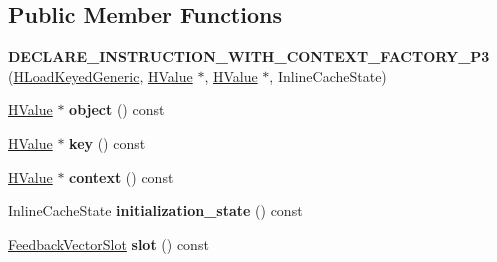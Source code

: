 \subsection*{Public Member Functions}
\begin{DoxyCompactItemize}
\item 
{\bfseries D\+E\+C\+L\+A\+R\+E\+\_\+\+I\+N\+S\+T\+R\+U\+C\+T\+I\+O\+N\+\_\+\+W\+I\+T\+H\+\_\+\+C\+O\+N\+T\+E\+X\+T\+\_\+\+F\+A\+C\+T\+O\+R\+Y\+\_\+\+P3} (\hyperlink{classv8_1_1internal_1_1_h_load_keyed_generic}{H\+Load\+Keyed\+Generic}, \hyperlink{classv8_1_1internal_1_1_h_value}{H\+Value} $\ast$, \hyperlink{classv8_1_1internal_1_1_h_value}{H\+Value} $\ast$, Inline\+Cache\+State)\hypertarget{classv8_1_1internal_1_1_h_load_keyed_generic_ae05a4bfd6dc3c566c8d059e0285dacdb}{}\label{classv8_1_1internal_1_1_h_load_keyed_generic_ae05a4bfd6dc3c566c8d059e0285dacdb}

\item 
\hyperlink{classv8_1_1internal_1_1_h_value}{H\+Value} $\ast$ {\bfseries object} () const \hypertarget{classv8_1_1internal_1_1_h_load_keyed_generic_ad3fba7de4da9b0bc53640b595f5163cc}{}\label{classv8_1_1internal_1_1_h_load_keyed_generic_ad3fba7de4da9b0bc53640b595f5163cc}

\item 
\hyperlink{classv8_1_1internal_1_1_h_value}{H\+Value} $\ast$ {\bfseries key} () const \hypertarget{classv8_1_1internal_1_1_h_load_keyed_generic_a029b57eba4b5bc54a487be283521f0f8}{}\label{classv8_1_1internal_1_1_h_load_keyed_generic_a029b57eba4b5bc54a487be283521f0f8}

\item 
\hyperlink{classv8_1_1internal_1_1_h_value}{H\+Value} $\ast$ {\bfseries context} () const \hypertarget{classv8_1_1internal_1_1_h_load_keyed_generic_a2a8bdb7fea7c726b72aa59ed00c46b2c}{}\label{classv8_1_1internal_1_1_h_load_keyed_generic_a2a8bdb7fea7c726b72aa59ed00c46b2c}

\item 
Inline\+Cache\+State {\bfseries initialization\+\_\+state} () const \hypertarget{classv8_1_1internal_1_1_h_load_keyed_generic_aa873ecbccae6b9f8de247362d53537aa}{}\label{classv8_1_1internal_1_1_h_load_keyed_generic_aa873ecbccae6b9f8de247362d53537aa}

\item 
\hyperlink{classv8_1_1internal_1_1_feedback_vector_slot}{Feedback\+Vector\+Slot} {\bfseries slot} () const \hypertarget{classv8_1_1internal_1_1_h_load_keyed_generic_a854a8a21074e418e8f6f17765901f2cd}{}\label{classv8_1_1internal_1_1_h_load_keyed_generic_a854a8a21074e418e8f6f17765901f2cd}


\end{DoxyCompactItemize}
